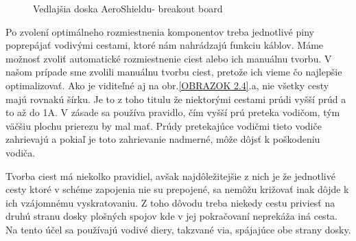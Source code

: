 \begin{figure}[!tbh]
	\hfill
	\hfill
	\hfill
	\caption{Vedlajšia doska AeroShieldu- breakout board}\label{OBRAZOK 2.6}
\end{figure}

Po zvolení optimálneho rozmiestnenia komponentov treba jednotlivé piny poprepájať vodivými cestami, ktoré nám nahrádzajú funkciu káblov. Máme možnosť zvoliť automatické rozmiestnenie ciest alebo ich manuálnu tvorbu. V našom prípade sme zvolili manuálnu tvorbu ciest, pretože ich vieme čo najlepšie optimalizovať. Ako je viditeľné aj na obr.\ref{OBRAZOK 2.4}.a, nie všetky cesty majú rovnakú šírku. Je to z toho titulu že niektorými cestami prúdi vyšší prúd a to až do 1A. V zásade sa používa pravidlo, čím vyšší prú preteka vodičom, tým väčšiu plochu prierezu by mal mať. Prúdy pretekajúce vodičmi tieto vodiče zahrievajú a pokiaľ je toto zahrievanie nadmerné, môže dôjsť k poškodeniu vodiča.  

Tvorba ciest má niekolko pravidiel, avšak najdôležitejšie z nich je že jednotlivé cesty ktoré v schéme zapojenia nie su prepojené, sa nemôžu križovať inak dôjde k ich vzájomnému vyskratovaniu. Z toho dôvodu treba niekedy cestu priviesť na druhú stranu dosky plošných spojov kde v jej pokračovaní neprekáža iná cesta. Na tento účel sa používajú vodivé diery, takzvané via, spájajúce obe strany dosky.

